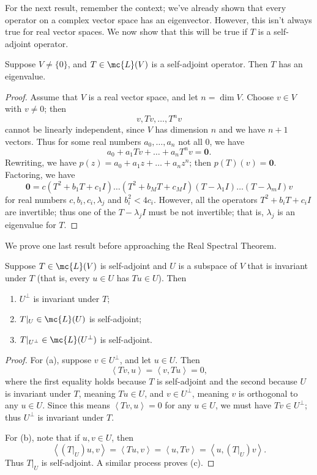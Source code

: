 \documentclass[math0540-lecture-notes.tex]{subfiles}
\begin{document}
For the next result, remember the context; we've already shown that every operator on a complex
vector space has an eigenvector. However, this isn't always true for real vector spaces. We now show
that this will be true if $T$ is a self-adjoint operator.
\begin{proposition}{}
  Suppose $V\neq \{ 0 \}$, and $T\in \mc{L}(V)$ is a self-adjoint operator. Then $T$ has an
  eigenvalue.
\end{proposition}
\begin{proof}[Proof]
  Assume that $V$ is a real vector space, and let $n=\dim{V}$. Choose $v\in V$ with $v\neq 0$; then
  \[
    v,Tv,\ldots,T^nv
  \] cannot be linearly independent, since $V$ has dimension $n$ and we have $n+1$ vectors. Thus for
  some real numbers $a_0,\ldots,a_n$ not all $0$, we have \[
    a_0+a_1Tv+\ldots+a_nT^nv=\textbf{0}
  .\] Rewriting, we have $p(z)=a_0+a_1z+\ldots+a_nz^n$; then $p(T)(v)=\textbf{0}$. Factoring, we
  have \[
    \textbf{0}=c(T^2+b_1T+c_1I)\ldots(T^2+b_MT+c_MI)(T-\lambda_1I)\ldots(T-\lambda_mI)v
  \] for real numbers $c,b_i,c_i,\lambda_j$ and $b_i^2<4c_i$. However, all the operators
  $T^2+b_iT+c_iI$ are invertible; thus one of the $T-\lambda_jI$ must be not invertible; that is,
  $\lambda_j$ is an eigenvalue for $T$.
\end{proof}

We prove one last result before approaching the Real Spectral Theorem.
\begin{proposition}[]{}
  Suppose $T\in \mc{L}(V)$ is self-adjoint and $U$ is a subspace of $V$ that is invariant under $T$
  (that is, every $u\in U$ has $Tu\in U$). Then
  \begin{enumerate}
    \item $U^{\bot}$ is invariant under $T$;
    \item $T|_U\in \mc{L}(U)$ is self-adjoint;
    \item $T|_{U^{\bot}}\in \mc{L}(U^{\bot})$ is self-adjoint.
  \end{enumerate}
\end{proposition}
\begin{proof}[Proof]
  For (a), suppose $v\in U^{\bot}$, and let $u\in U$. Then \[
    \left<Tv,u \right> =\left<v,Tu \right> =0
  ,\] where the first equality holds because $T$ is self-adjoint and the second because $U$ is
  invariant under $T$, meaning $Tu\in U$, and $v\in U^{\bot}$, meaning $v$ is orthogonal to any
  $u\in U$. Since this means $\left<Tv,u \right> =0$ for any $u\in U$, we must have $Tv\in
  U^{\bot}$; thus $U^{\bot}$ is invariant under $T$.

  For (b), note that if $u,v\in U$, then \[
    \left<(T|_U)u,v \right> =\left<Tu,v \right> =\left<u,Tv \right> =\left<u,(T|_U)v \right> 
  .\] Thus $T|_U$ is self-adjoint. A similar process proves (c).
\end{proof}
\end{document}
